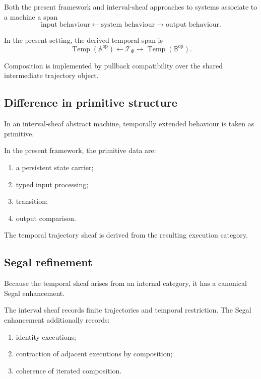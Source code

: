 Both the present framework and interval-sheaf approaches to systems associate
to a machine a span
\[
    \text{input behaviour}
    \longleftarrow
    \text{system behaviour}
    \longrightarrow
    \text{output behaviour}.
\]

In the present setting, the derived temporal span is
\[
    \operatorname{Temp}(\mathbb A^{\mathrm{op}})
    \longleftarrow
    \mathscr T_\Phi
    \longrightarrow
    \operatorname{Temp}(\mathbb B^{\mathrm{op}}).
\]

Composition is implemented by pullback compatibility over the shared
intermediate trajectory object.

\subsection{Difference in primitive structure}
\label{subsec:difference-primitive-structure}

In an interval-sheaf abstract machine, temporally extended behaviour is taken
as primitive.

In the present framework, the primitive data are:
\begin{enumerate}
    \item a persistent state carrier;
    \item typed input processing;
    \item transition;
    \item output comparison.
\end{enumerate}

The temporal trajectory sheaf is derived from the resulting execution
category.

\subsection{Segal refinement}
\label{subsec:segal-refinement-comparison}

Because the temporal sheaf arises from an internal category, it has a
canonical Segal enhancement.

The interval sheaf records finite trajectories and temporal restriction. The
Segal enhancement additionally records:
\begin{enumerate}
    \item identity executions;
    \item contraction of adjacent executions by composition;
    \item coherence of iterated composition.
\end{enumerate}

